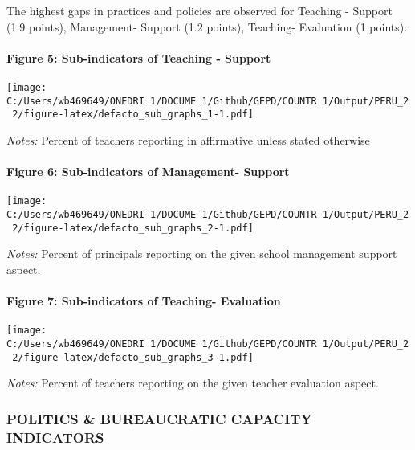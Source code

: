 \documentclass[twocolumn]{article}
\let\oldparagraph\paragraph
\renewcommand{\paragraph}[1]{\oldparagraph{#1}\mbox{}}
\begin{document}
The highest gaps in practices and policies are observed for Teaching -
Support (1.9 points), Management- Support (1.2 points), Teaching-
Evaluation (1 points). \vfill\null

\hypertarget{figure-5-sub-indicators-of-teaching---support}{%
\paragraph{Figure 5: Sub-indicators of Teaching -
Support}\label{figure-5-sub-indicators-of-teaching---support}}

\texttt{[image: C:/Users/wb469649/ONEDRI~1/DOCUME~1/Github/GEPD/COUNTR~1/Output/PERU\_2~2/figure-latex/defacto\_sub\_graphs\_1-1.pdf]}

\color{darkgray}\scriptsize{\textit{Notes:} Percent of teachers reporting in affirmative unless stated otherwise}

\hypertarget{figure-6-sub-indicators-of-management--support}{%
\paragraph{Figure 6: Sub-indicators of Management-
Support}\label{figure-6-sub-indicators-of-management--support}}

\texttt{[image: C:/Users/wb469649/ONEDRI~1/DOCUME~1/Github/GEPD/COUNTR~1/Output/PERU\_2~2/figure-latex/defacto\_sub\_graphs\_2-1.pdf]}

\color{darkgray}\scriptsize{\textit{Notes:} Percent of principals reporting on the given school management support aspect.}

\hypertarget{figure-7-sub-indicators-of-teaching--evaluation}{%
\paragraph{Figure 7: Sub-indicators of Teaching-
Evaluation}\label{figure-7-sub-indicators-of-teaching--evaluation}}

\texttt{[image: C:/Users/wb469649/ONEDRI~1/DOCUME~1/Github/GEPD/COUNTR~1/Output/PERU\_2~2/figure-latex/defacto\_sub\_graphs\_3-1.pdf]}

\color{darkgray}\scriptsize{\textit{Notes:} Percent of teachers reporting on the given teacher evaluation aspect.}

\vfill\null

\hypertarget{politics-bureaucratic-capacity-indicators}{%
\subsubsection{\texorpdfstring{\textbf{POLITICS \& BUREAUCRATIC CAPACITY
INDICATORS}}{POLITICS \& BUREAUCRATIC CAPACITY INDICATORS}}\label{politics-bureaucratic-capacity-indicators}}
\end{document}
